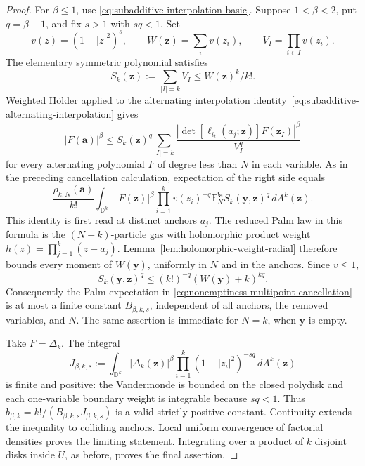 \documentclass[11pt,a4paper]{article}
\numberwithin{equation}{section}
\theoremstyle{definition}
\theoremstyle{remark}
\newcommand{\D}{\mathbb D}
\begin{document}
\begin{proof}
For $\beta\le1$, use
\eqref{eq:subadditive-interpolation-basic}. Suppose $1<\beta<2$,
put $q=\beta-1$, and fix $s>1$ with $sq<1$. Set
\[
 v(z)=(1-|z|^2)^s,\qquad W(\mathbf z)=\sum_i v(z_i),
 \qquad V_I=\prod_{i\in I}v(z_i).
\]
The elementary symmetric polynomial satisfies
\[
 S_k(\mathbf z):=\sum_{|I|=k}V_I\le W(\mathbf z)^k/k!.
\]
Weighted H\"older applied to the alternating interpolation
identity~\eqref{eq:subadditive-alternating-interpolation} gives
\[
 |F(\mathbf a)|^\beta\le S_k(\mathbf z)^q
 \sum_{|I|=k}
 \frac{\left|\det[\ell_{i_t}(a_j;\mathbf z)]
                         F(\mathbf z_I)\right|^\beta}{V_I^q}
\]
for every alternating polynomial $F$ of degree less than $N$ in
each variable. As in the preceding cancellation calculation,
expectation of the right side equals
\begin{equation}
 \frac{\rho_{k,N}(\mathbf a)}{k!}
 \int_{\D^k}|F(\mathbf z)|^\beta
       \prod_{i=1}^k v(z_i)^{-q}
       \mathbb E_N^{!\mathbf a}S_k(\mathbf y,\mathbf z)^q
                                      \,dA^k(\mathbf z).
 \label{eq:nonemptiness-multipoint-cancellation}
\end{equation}
This identity is first read at distinct anchors $a_j$.
The reduced Palm law in this formula is the $(N-k)$-particle gas
with holomorphic product weight
$h(z)=\prod_{j=1}^k(z-a_j)$. Lemma~\ref{lem:holomorphic-weight-radial}
therefore bounds every moment of $W(\mathbf y)$, uniformly in
$N$ and in the anchors. Since $v\le1$,
\[
 S_k(\mathbf y,\mathbf z)^q
 \le (k!)^{-q}(W(\mathbf y)+k)^{kq}.
\]
Consequently the Palm expectation in
\eqref{eq:nonemptiness-multipoint-cancellation} is at most a finite
constant $B_{\beta,k,s}$, independent of all anchors, the removed
variables, and $N$. The same assertion is immediate for $N=k$,
when $\mathbf y$ is empty.

Take $F=\Delta_k$. The integral
\[
 J_{\beta,k,s}:=\int_{\D^k}|\Delta_k(\mathbf z)|^\beta
           \prod_{i=1}^k(1-|z_i|^2)^{-sq}\,dA^k(\mathbf z)
\]
is finite and positive: the Vandermonde is bounded on the closed
polydisk and each one-variable boundary weight is integrable
because $sq<1$. Thus
$b_{\beta,k}=k!/(B_{\beta,k,s}J_{\beta,k,s})$ is a valid strictly
positive constant. Continuity extends the inequality to colliding
anchors. Local uniform convergence of factorial densities proves
the limiting statement. Integrating over a product of $k$ disjoint
disks inside $U$, as before, proves the final assertion.
\end{proof}
\end{document}
